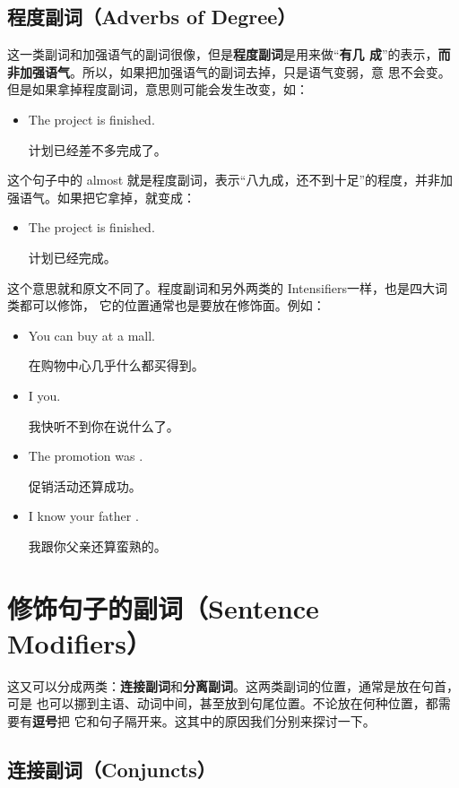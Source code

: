 \subsection{程度副词（Adverbs of Degree）}

这一类副词和加强语气的副词很像，但是\textbf{程度副词}是用来做“\textbf{有几
  成}”的表示，\textbf{而非加强语气}。所以，如果把加强语气的副词去掉，只是语气变弱，意
思不会变。但是如果拿掉程度副词，意思则可能会发生改变，如：
\begin{itemize}
\item  The project is  finished.

  计划已经差不多完成了。
\end{itemize}
这个句子中的 almost
就是程度副词，表示“八九成，还不到十足”的程度，并非加强语气。如果把它拿掉，就变成：
\begin{itemize}
\item  The project is finished.

  计划已经完成。
\end{itemize}
这个意思就和原文不同了。程度副词和另外两类的 Intensifiers一样，也是四大词类都可以修饰，
它的位置通常也是要放在修饰面。例如：
\begin{itemize}
\item You can buy   at a mall.

  在购物中心几乎什么都买得到。
\item I    you.

  我快听不到你在说什么了。
\item The promotion was   .

  促销活动还算成功。
\item I know your father  .

  我跟你父亲还算蛮熟的。
\end{itemize}

\section{修饰句子的副词（Sentence Modifiers）}

这又可以分成两类：\textbf{连接副词}和\textbf{分离副词}。这两类副词的位置，通常是放在句首，可是
也可以挪到主语、动词中间，甚至放到句尾位置。不论放在何种位置，都需要有\textbf{逗号}把
它和句子隔开来。这其中的原因我们分别来探讨一下。

\subsection{连接副词（Conjuncts）}

